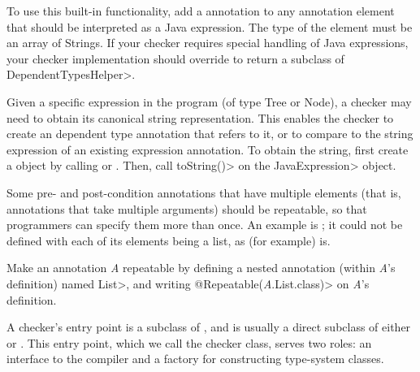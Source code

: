 To use this built-in functionality, add a  annotation
to any annotation element that should be interpreted as a Java expression.  The type of the
element must be an array of Strings.  If your checker requires special handling of Java expressions,
your checker implementation should override
to return a subclass of \<DependentTypesHelper>.

Given a specific expression in the program (of type Tree or Node), a
checker may need to obtain its canonical string representation.  This
enables the checker to create an dependent type annotation that refers to
it, or to compare to the string expression of an existing expression
annotation.
To obtain the string, first create a
 object by calling
 or
.
Then, call \<toString()> on the \<JavaExpression> object.



Some pre- and post-condition annotations that have multiple elements (that
is, annotations that take multiple arguments) should be repeatable, so that
programmers can specify them more than once.  An example is
; it could not be
defined with each of its elements being a list, as (for example)
 is.

Make an annotation \emph{A} repeatable by defining a nested annotation (within
\emph{A}'s definition) named \<List>, and writing
\<@Repeatable(\emph{A}.List.class)> on \emph{A}'s definition.



A checker's entry point is a subclass of
, and is usually a direct subclass
of either  or
.
This entry
point, which we call the checker class, serves two
roles:  an interface to the compiler and a factory for constructing
type-system classes.

